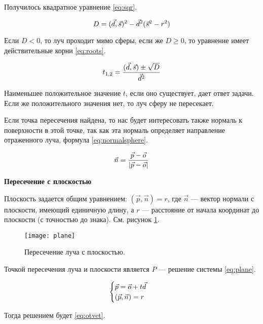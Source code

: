 Получилось квадратное уравнение \ref{eq:sqr}. 

\begin{equation}
	\centering
	D = (\vec d, \vec s)^2- \vec d^2 (\vec s ^2- r^2)
	\label{eq:sqr}
\end{equation}

Если $D < 0$, то луч проходит мимо сферы, если же $D \ge 0$, то уравнение имеет действительные корни \ref{eq:roots}. 

\begin{equation}
	\centering
	t_{1,2}=\frac{(\vec d, \vec s) \pm \sqrt{D} }{\vec d^2}
	\centering
	\label{eq:roots}
\end{equation}

Наименьшее положительное значение $t$, если оно существует, дает ответ задачи. Если же положительного значения нет, то луч сферу не пересекает.

Если точка пересечения найдена, то нас будет интересовать также нормаль к поверхности в этой точке, так как эта нормаль определяет направление отраженного луча, формула \ref{eq:normalsphere}. 

\begin{equation}
	\centering
   		\vec n = \frac{\vec p - \vec o}{|\vec p - \vec o|}
	\label{eq:normalsphere}
\end{equation}

\textbf{Пересечение с плоскостью}

Плоскость задается общим уравнением: $(\vec p, \vec n) = r$, где $\vec n$ --- вектор нормали с плоскости, имеющий единичную длину, а $r$ --- расстояние от начала координат до плоскости (с точностью до знака). См. рисунок \ref{img:plane}. 

\begin{figure}[H]
	\centering
	\texttt{[image: plane]}
	\caption{Пересечение луча с плоскостью. }
	\label{img:plane}
\end{figure}

Точкой пересечения луча и плоскости является $P$ --- решение системы  \ref{eq:plane}. 

\begin{equation}
	\centering
	\begin{cases}
   		\vec p = \vec o + t\vec d\\
   		(\vec p, \vec n) = r
 	\end{cases}
	\label{eq:plane}
\end{equation}

Тогда решением будет \ref{eq:otvet}. 

